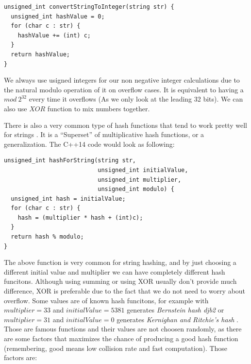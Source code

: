 \begin{lstlisting}
unsigned_int convertStringToInteger(string str) {
  unsigned_int hashValue = 0;
  for (char c : str) {
    hashValue += (int) c;
  }
  return hashValue;
}
\end{lstlisting}

We always use usigned integers for our non negative integer calculations due to the natural modulo operation of it on overflow cases. It is equivalent to having a \( mod \ 2^{32} \) every time it overflows (As we only look at the leading 32 bits). We can also use \( XOR \) function to mix numbers together. 

There is also a very common type of hash functions that tend to work pretty well for strings \cite{DragonHashFunc}. It is a ``Superset'' of multiplicative hash functions, or a generalization. The C++14 code would look as following:

\begin{lstlisting}
unsigned_int hashForString(string str,
                           unsigned_int initialValue,
                           unsigned_int multiplier,
                           unsigned_int modulo) {
  unsigned_int hash = initialValue;
  for (char c : str) {
    hash = (multiplier * hash + (int)c);
  }
  return hash % modulo;
}
\end{lstlisting}

The above function is very common for string hashing, and by just choosing a different initial value and multiplier we can have completely different hash funcitons. Although using summing or using XOR usually don't provide much difference, XOR is preferable due to the fact that we do not need to worry about overflow. Some values are of known hash funcitons, for example with \( multiplier = 33 \) and \( initialValue = 5381 \) generates \textit{Bernstein hash djb2} \cite{BernsteinHash} or \( multiplier = 31 \) and \( initialValue = 0 \) generates \textit{Kernighan and Ritchie's hash} \cite{KernighanHash}. Those are famous functions and their values are not choosen randomly, as there are some factors that maximizes the chance of producing a good hash function (remembering, good means low collision rate and fast computation). Those factors are:

